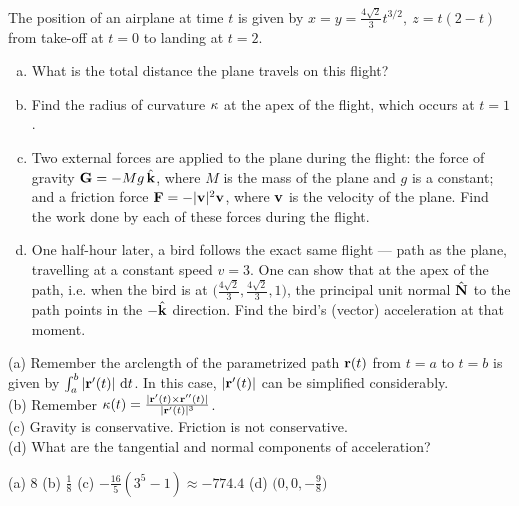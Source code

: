 
\begin{question}[M317 2001D] %
	The position of an airplane at time $t$ is given by
	$
	x=y=\frac{4\sqrt{2}}{3}t^{3/2},\ z=t(2-t)
	$
	from take-off at $t=0$ to landing at $t=2$.
	\begin{enumerate}[(a)]
		\item
		What is the total distance the plane travels on this flight?
		
		\item
		Find the radius of curvature $\kappa$ at the apex of the flight, which occurs
		at $t=1$.
		
		\item
		Two external forces are applied to the plane during the
		flight: the force of gravity $\mathbf{G}=-M g\,\hat{\mathbf{k}}$, where $M$ is the mass of
		the plane and $g$ is a constant; and a friction force $\mathbf{F}=-|\mathbf{v}|^2\mathbf{v}$,
		where $\mathbf{v}$ is the velocity of the plane. Find the work done by each of
		these forces during the flight.
		
		\item
		One half-hour later, a bird follows the exact same flight --- path
		as the plane, travelling at a constant speed $v=3$. One can show that 
		at the apex of the path, i.e. when the bird is at 
		$\big(\frac{4\sqrt{2}}{3},\frac{4\sqrt{2}}{3},1\big)$, the principal
		unit normal $\hat{\mathbf{N}}$ to the path points in the $-\hat{\mathbf{k}}$ direction. Find the bird's (vector)
		acceleration at that moment. 
	\end{enumerate}
\end{question}

\begin{hint}
	(a) Remember the arclength of the parametrized path $\mathbf{r}(t)$ from $t=a$ to $t=b$ is given by $\int_a^b |\vr'(t)|\ \dee{t}$. In this case, $|\mathbf{r}'(t)|$ can be simplified considerably.\\
	(b) Remember $\kappa(t)  = \frac{|\mathbf{r}'(t)\times\mathbf{r}''(t)|}{|\mathbf{r}'(t)|^3}$.\\
	(c) Gravity is conservative. Friction is not conservative.\\	
	(d) What are the tangential and normal components of acceleration? 
\end{hint}

\begin{answer} 
	(a) $8$\qquad
	(b) $\frac{1}{8}$\qquad
	(c) $-\frac{16}{5}(3^5-1)\approx-774.4$\qquad
	(d) $\Big(0,0,-\frac{9}{8}\Big)$
\end{answer}

